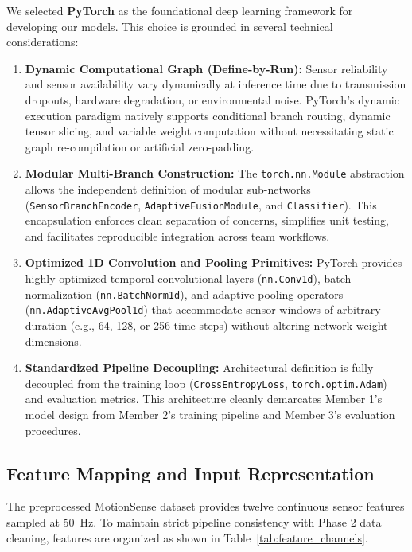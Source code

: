 We selected \textbf{PyTorch} as the foundational deep learning framework for developing our models. This choice is grounded in several technical considerations:
\begin{enumerate}
    \item \textbf{Dynamic Computational Graph (Define-by-Run):} Sensor reliability and sensor availability vary dynamically at inference time due to transmission dropouts, hardware degradation, or environmental noise. PyTorch's dynamic execution paradigm natively supports conditional branch routing, dynamic tensor slicing, and variable weight computation without necessitating static graph re-compilation or artificial zero-padding.
    \item \textbf{Modular Multi-Branch Construction:} The \texttt{torch.nn.Module} abstraction allows the independent definition of modular sub-networks (\texttt{SensorBranchEncoder}, \texttt{AdaptiveFusionModule}, and \texttt{Classifier}). This encapsulation enforces clean separation of concerns, simplifies unit testing, and facilitates reproducible integration across team workflows.
    \item \textbf{Optimized 1D Convolution and Pooling Primitives:} PyTorch provides highly optimized temporal convolutional layers (\texttt{nn.Conv1d}), batch normalization (\texttt{nn.BatchNorm1d}), and adaptive pooling operators (\texttt{nn.AdaptiveAvgPool1d}) that accommodate sensor windows of arbitrary duration (e.g., 64, 128, or 256 time steps) without altering network weight dimensions.
    \item \textbf{Standardized Pipeline Decoupling:} Architectural definition is fully decoupled from the training loop (\texttt{CrossEntropyLoss}, \texttt{torch.optim.Adam}) and evaluation metrics. This architecture cleanly demarcates Member 1's model design from Member 2's training pipeline and Member 3's evaluation procedures.
\end{enumerate}

\subsection{Feature Mapping and Input Representation}
\label{subsec:feature_mapping}

The preprocessed MotionSense dataset provides twelve continuous sensor features sampled at 50~Hz. To maintain strict pipeline consistency with Phase 2 data cleaning, features are organized as shown in Table~\ref{tab:feature_channels}.

